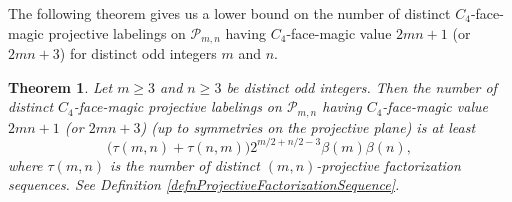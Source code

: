 \documentclass[12pt]{amsart}
\theoremstyle{definition}
\theoremstyle{plain}
\newtheorem{theorem}[definition]{Theorem}
\begin{document}
The following theorem gives us a lower bound on the number of distinct
$C_4$-face-magic projective labelings on $\mathcal{P}_{m,n}$ having $C_4$-face-magic value $2mn +1$ (or $2mn +3$) for distinct odd integers $m$ and $n$.


\begin{theorem}   \label{thmNumberOfBicentrallyBalancedLabelingsOnRectangle}
  Let $m \geqslant 3$ and $n \geqslant 3$ be distinct odd integers.
  Then the number of distinct $C_4$-face-magic projective labelings on $\mathcal{P}_{m,n}$ having $C_4$-face-magic value $2mn+1$ (or $2mn+3$)
  (up to symmetries on the projective plane) is at least
  \begin{equation*}
     \bigl( \tau(m,n) + \tau(n,m) \bigr) 2^{m/2+n/2-3} \beta(m)  \beta(n),
  \end{equation*}
  where $\tau(m,n)$ is the number of distinct $(m,n)$-projective factorization sequences. See Definition \ref{defnProjectiveFactorizationSequence}.
\end{theorem}
\end{document}
